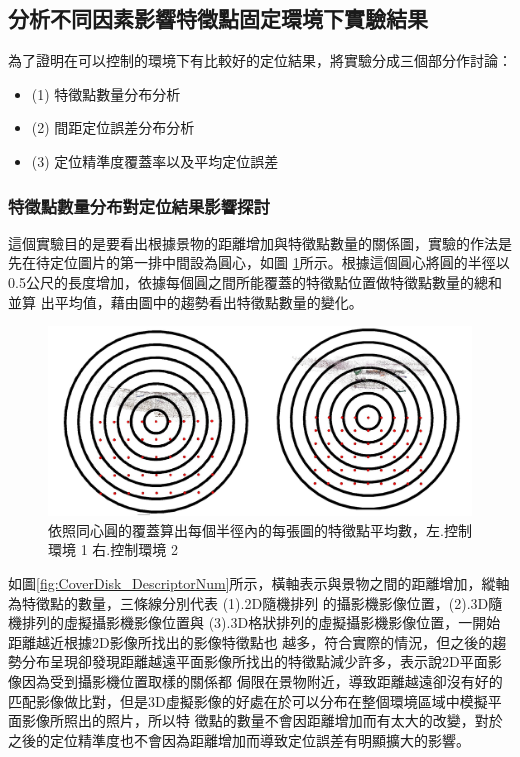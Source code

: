 

\subsection{分析不同因素影響特徵點固定環境下實驗結果}

	為了證明在可以控制的環境下有比較好的定位結果，將實驗分成三個部分作討論：
	
\begin{itemize}
  \item (1) 特徵點數量分布分析
  \item (2) 間距定位誤差分布分析
  \item (3) 定位精準度覆蓋率以及平均定位誤差
\end{itemize}

		
\subsubsection{特徵點數量分布對定位結果影響探討}

	這個實驗目的是要看出根據景物的距離增加與特徵點數量的關係圖，實驗的作法是先在待定位圖片的第一排中間設為圓心，如圖
\ref{fig:CoverDisk}所示。根據這個圓心將圓的半徑以 0.5公尺的長度增加，依據每個圓之間所能覆蓋的特徵點位置做特徵點數量的總和並算
出平均值，藉由圖中的趨勢看出特徵點數量的變化。

\begin{figure}
\begin{center}
  \includegraphics[width=1.0\textwidth]{figures/CoverDisk.jpg}
  \caption{依照同心圓的覆蓋算出每個半徑內的每張圖的特徵點平均數，左.控制環境 1 右.控制環境 2}
  \label{fig:CoverDisk}
\end{center}
\end{figure}
	
	如圖\ref{fig:CoverDisk_DescriptorNum}所示，橫軸表示與景物之間的距離增加，縱軸為特徵點的數量，三條線分別代表 (1).2D隨機排列
的攝影機影像位置，(2).3D隨機排列的虛擬攝影機影像位置與 (3).3D格狀排列的虛擬攝影機影像位置，一開始距離越近根據2D影像所找出的影像特徵點也
越多，符合實際的情況，但之後的趨勢分布呈現卻發現距離越遠平面影像所找出的特徵點減少許多，表示說2D平面影像因為受到攝影機位置取樣的關係都
侷限在景物附近，導致距離越遠卻沒有好的匹配影像做比對，但是3D虛擬影像的好處在於可以分布在整個環境區域中模擬平面影像所照出的照片，所以特
徵點的數量不會因距離增加而有太大的改變，對於之後的定位精準度也不會因為距離增加而導致定位誤差有明顯擴大的影響。
			
